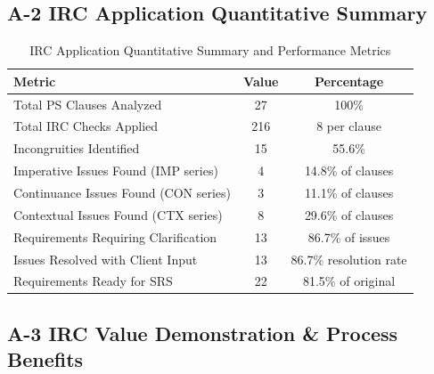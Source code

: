 \documentclass[12pt,a4paper]{article}
\begin{document}
\newpage
\subsection*{A-2 IRC Application Quantitative Summary}

\begin{table}[H]
\centering
\small
\renewcommand{\arraystretch}{1.2}
\begin{tabular}{|>{\raggedright\arraybackslash}p{}|c|c|}
\hline
\rowcolor{tableheader}
\textbf{Metric} & \textbf{Value} & \textbf{Percentage} \\
\hline
Total PS Clauses Analyzed & 27 & 100\% \\
\hline
Total IRC Checks Applied & 216 & 8 per clause \\
\hline
Incongruities Identified & 15 & 55.6\% \\
\hline
Imperative Issues Found (IMP series) & 4 & 14.8\% of clauses \\
\hline
Continuance Issues Found (CON series) & 3 & 11.1\% of clauses \\
\hline
Contextual Issues Found (CTX series) & 8 & 29.6\% of clauses \\
\hline
Requirements Requiring Clarification & 13 & 86.7\% of issues \\
\hline
Issues Resolved with Client Input & 13 & 86.7\% resolution rate \\
\hline
Requirements Ready for SRS & 22 & 81.5\% of original \\
\hline
\end{tabular}
\caption{IRC Application Quantitative Summary and Performance Metrics}
\end{table}

\subsection*{A-3 IRC Value Demonstration \& Process Benefits}
\end{document}
